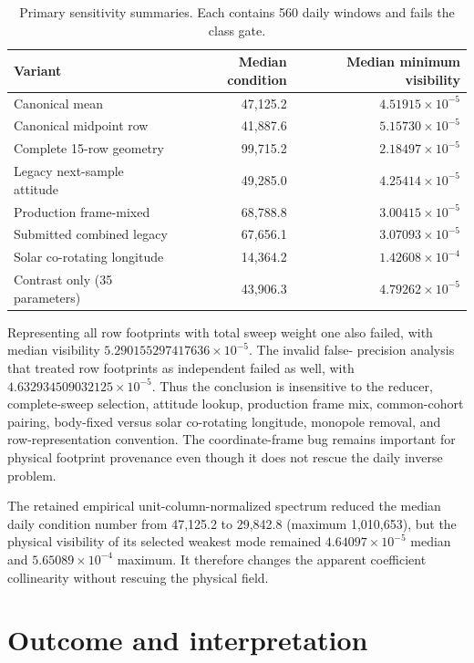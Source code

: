 \documentclass[11pt]{article}
\begin{document}
\begin{table}[ht]
\centering
\caption{Primary sensitivity summaries.  Each contains 560 daily windows and
fails the class gate.}
\label{tab:sensitivity}
\begin{tabular}{lrr}
\toprule
Variant & Median condition & Median minimum visibility \\
\midrule
Canonical mean & 47,125.2 & $4.51915\times10^{-5}$ \\
Canonical midpoint row & 41,887.6 & $5.15730\times10^{-5}$ \\
Complete 15-row geometry & 99,715.2 & $2.18497\times10^{-5}$ \\
Legacy next-sample attitude & 49,285.0 & $4.25414\times10^{-5}$ \\
Production frame-mixed & 68,788.8 & $3.00415\times10^{-5}$ \\
Submitted combined legacy & 67,656.1 & $3.07093\times10^{-5}$ \\
Solar co-rotating longitude & 14,364.2 & $1.42608\times10^{-4}$ \\
Contrast only (35 parameters) & 43,906.3 & $4.79262\times10^{-5}$ \\
\bottomrule
\end{tabular}
\end{table}

Representing all row footprints with total sweep weight one also failed, with
median visibility $5.290155297417636\times10^{-5}$.  The invalid false-
precision analysis that treated row footprints as independent failed as well,
with $4.632934509032125\times10^{-5}$.  Thus the conclusion is insensitive to
the reducer, complete-sweep selection, attitude lookup, production frame mix,
common-cohort pairing, body-fixed versus solar co-rotating longitude, monopole
removal, and row-representation convention.  The coordinate-frame bug remains
important for physical footprint provenance even though it does not rescue the
daily inverse problem.

The retained empirical unit-column-normalized spectrum reduced the median
daily condition number from 47,125.2 to 29,842.8 (maximum 1,010,653), but the
physical visibility of its selected weakest mode remained
$4.64097\times10^{-5}$ median and $5.65089\times10^{-4}$ maximum.  It therefore
changes the apparent coefficient collinearity without rescuing the physical
field.

\section{Outcome and interpretation}
\end{document}
